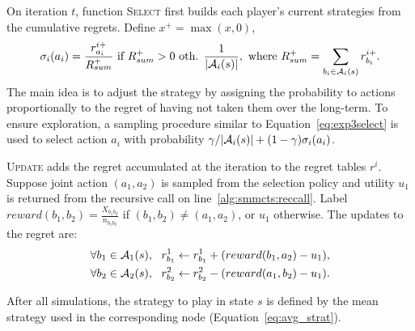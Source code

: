 On iteration $t$, function \textsc{Select} first builds
each player's current strategies from the cumulative regrets. Define $x^+ = \max(x,0)$,
\begin{equation}
\sigma_i(a_i) = \frac{r^{i+}_{a_i}}{R^+_{sum}} \mbox{ if } R^+_{sum} > 0
\mbox{ oth. } \frac{1}{|\mathcal{A}_i(s)|}, \mbox{ where } R^+_{sum} = \sum_{b_i \in \mathcal{A}_i(s)}{r^{i+}_{b_i}}.
\end{equation}
The main idea is to adjust the strategy by assigning the probability to actions proportionally to the regret of having not taken them over the long-term.
To ensure exploration, a sampling procedure similar to Equation~\ref{eq:exp3select} is used to select action $a_i$ with probability
$\gamma/|\mathcal{A}_i(s)| + (1-\gamma) \sigma_i(a_i)$.

\textsc{Update} adds the regret accumulated at the iteration to
the regret tables $r^i$. Suppose joint action $(a_1,a_2)$ is
sampled from the selection policy and utility $u_1$ is returned from the recursive call on line~\ref{alg:smmcts:reccall}.
Label $reward(b_1,b_2) = \frac{X_{b_1b_2}}{n_{b_1b_2}}$ if
$(b_1,b_2) \not= (a_1,a_2)$, or $u_1$ otherwise. The updates to the regret are:
\begin{eqnarray}
\forall b_1 \in \mathcal{A}_1(s), ~~  r^1_{b_1} \leftarrow r^1_{b_1} + ( reward(b_1, a_2) - u_1 ),\\
\forall b_2 \in \mathcal{A}_2(s), ~~  r^2_{b_2} \leftarrow r^2_{b_2} - ( reward(a_1, b_2) - u_1).
\end{eqnarray}

After all simulations, the strategy to play in state $s$ is defined by the mean strategy used in the corresponding node (Equation~\ref{eq:avg_strat}).

